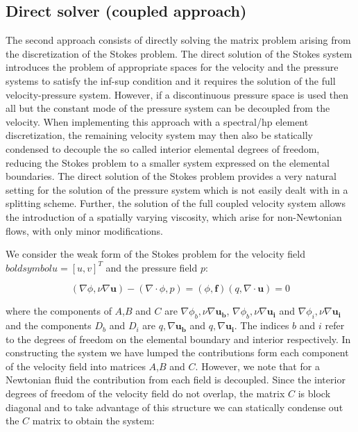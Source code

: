 \subsection{Direct solver (coupled approach)}
\label{DirectSolv}
The second approach consists of directly solving the matrix problem
arising from the discretization of the Stokes problem.  The direct
solution of the Stokes system introduces the problem of appropriate
spaces for the velocity and the pressure systems to satisfy the
inf-sup condition and it requires the solution of the full
velocity-pressure system. However, if a discontinuous pressure space
is used then all but the constant mode of the pressure system can be
decoupled from the velocity. When implementing this
approach with a spectral/hp element discretization, the remaining
velocity system may then also be statically condensed to decouple the so
called interior elemental degrees of freedom, reducing the Stokes
problem to a smaller system expressed on the elemental boundaries. The
direct solution of the Stokes problem provides a very natural setting
for the solution of the pressure system which is not easily dealt with
in a splitting scheme. Further, the solution of the full coupled
velocity system allows the introduction of a spatially varying
viscosity, which arise for non-Newtonian flows, with only minor
modifications.

We consider the weak form of the Stokes problem for the velocity field
$boldsymbol{u}=[u,v]^{T}$ and the pressure field $p$:

\begin{subequations}
\begin{equation}
 (\nabla \phi,\nu \nabla \boldsymbol{u}) - (\nabla\cdot\phi,p)=(\phi,\boldsymbol{f})
\end{equation}
\begin{equation}
 (q,\nabla \cdot \boldsymbol{u}) = 0
\end{equation}
\end{subequations}

where the components of $A$,$B$ and $C$ are
$\nabla\phi_b,\nu\nabla\boldsymbol{u_b}$,
$\nabla\phi_b,\nu\nabla\boldsymbol{u_i}$ and
$\nabla\phi_i,\nu\nabla\boldsymbol{u_i}$ and the components $D_b$ and
$D_i$ are $q,\nabla\boldsymbol{u_b}$ and $q,\nabla\boldsymbol{u_i}$.
The indices $b$ and $i$ refer to the degrees of freedom on the
elemental boundary and interior respectively. In constructing the
system we have lumped the contributions form each component of the
velocity field into matrices $A$,$B$ and $C$. However, we note that
for a Newtonian fluid the contribution from each field is
decoupled. Since the interior degrees of freedom of the velocity field
do not overlap, the matrix $C$ is block diagonal and to take advantage
of this structure we can statically condense out the $C$ matrix to
obtain the system:

